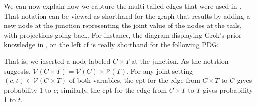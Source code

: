 \documentclass{article}
\newcommand{\V}{\mathcal V}
\newcommand{\MN}{PDG}
\numberwithin{equation}{section}
\begin{document}
We can now explain how we capture the multi-tailed edges that were used in .
That notation can be viewed as shorthand for the graph that results by adding a new node at the junction representing the joint value of the nodes at the tails, with projections going back.  For instance,
the diagram displaying Grok's prior knowledge in , on the left of 
is really shorthand for the following \MN:
	\begin{center}
% 
% 
% 
	\end{center}
That is, we inserted a node labeled $C \times T$ at the junction.  As
the notation suggests, $\V( C \times T) = \V(C) \times \V(T)$.
For any joint setting $(c,t) \in \V(C \times T)$ of both variables, the cpt for
the edge from $C \times T$ to $C$ gives probability 1 to $c$;
similarly, the cpt for the edge from $ C \times T$ to $T$ gives probability 1 to $t$.
\end{document}
